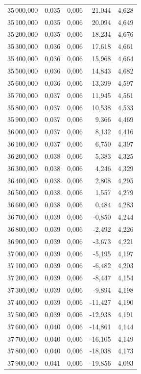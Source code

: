 \begin{longtable}{rrrrr}
35\,000,000 & 0,035 & 0,006 & 21,044 & 4,628\\
35\,100,000 & 0,035 & 0,006 & 20,094 & 4,649\\
35\,200,000 & 0,035 & 0,006 & 18,234 & 4,676\\
35\,300,000 & 0,036 & 0,006 & 17,618 & 4,661\\
35\,400,000 & 0,036 & 0,006 & 15,968 & 4,664\\
35\,500,000 & 0,036 & 0,006 & 14,843 & 4,682\\
35\,600,000 & 0,036 & 0,006 & 13,399 & 4,597\\
35\,700,000 & 0,037 & 0,006 & 11,945 & 4,561\\
35\,800,000 & 0,037 & 0,006 & 10,538 & 4,533\\
35\,900,000 & 0,037 & 0,006 & 9,366 & 4,469\\
36\,000,000 & 0,037 & 0,006 & 8,132 & 4,416\\
36\,100,000 & 0,037 & 0,006 & 6,750 & 4,397\\
36\,200,000 & 0,038 & 0,006 & 5,383 & 4,325\\
36\,300,000 & 0,038 & 0,006 & 4,246 & 4,329\\
36\,400,000 & 0,038 & 0,006 & 2,808 & 4,295\\
36\,500,000 & 0,038 & 0,006 & 1,557 & 4,279\\
36\,600,000 & 0,038 & 0,006 & 0,484 & 4,283\\
36\,700,000 & 0,039 & 0,006 & -0,850 & 4,244\\
36\,800,000 & 0,039 & 0,006 & -2,492 & 4,226\\
36\,900,000 & 0,039 & 0,006 & -3,673 & 4,221\\
37\,000,000 & 0,039 & 0,006 & -5,195 & 4,197\\
37\,100,000 & 0,039 & 0,006 & -6,482 & 4,203\\
37\,200,000 & 0,039 & 0,006 & -8,447 & 4,154\\
37\,300,000 & 0,039 & 0,006 & -9,894 & 4,198\\
37\,400,000 & 0,039 & 0,006 & -11,427 & 4,190\\
37\,500,000 & 0,039 & 0,006 & -12,938 & 4,191\\
37\,600,000 & 0,040 & 0,006 & -14,861 & 4,144\\
37\,700,000 & 0,040 & 0,006 & -16,105 & 4,149\\
37\,800,000 & 0,040 & 0,006 & -18,038 & 4,173\\
37\,900,000 & 0,041 & 0,006 & -19,856 & 4,093\\

\end{longtable}
